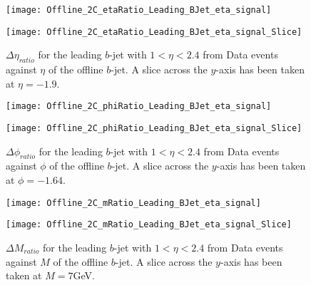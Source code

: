 		\begin{figure}[h]
			\centering
			
			\begin{minipage}[h]{0.33\linewidth}
				\texttt{[image: Offline\_2C\_etaRatio\_Leading\_BJet\_eta\_signal]}
			\end{minipage}
			\quad
			\begin{minipage}[h]{0.33\linewidth}
				\texttt{[image: Offline\_2C\_etaRatio\_Leading\_BJet\_eta\_signal\_Slice]}
			\end{minipage}
			\caption{$\Delta \eta_{ratio}$ for the leading \pt $b$-jet with $1 < \eta < 2.4$ from Data events against $\eta$ of the offline $b$-jet. A slice across the $y$-axis has been taken at $\eta=-1.9$. }
			\label{fig:D:leadingbetacore}
		\end{figure}
		
		\begin{figure}[h]
			\centering
			
			\begin{minipage}[h]{0.33\linewidth}
				\texttt{[image: Offline\_2C\_phiRatio\_Leading\_BJet\_eta\_signal]}
			\end{minipage}
			\quad
			\begin{minipage}[h]{0.33\linewidth}
				\texttt{[image: Offline\_2C\_phiRatio\_Leading\_BJet\_eta\_signal\_Slice]}
			\end{minipage}
			\caption{$\Delta \phi_{ratio}$ for the leading \pt $b$-jet with $1 < \eta < 2.4$ from Data events against $\phi$ of the offline $b$-jet. A slice across the $y$-axis has been taken at $\phi=-1.64$. }
			\label{fig:D:leadingbphicore}
		\end{figure}
		
		\begin{figure}[h]
			\centering
			
			\begin{minipage}[h]{0.33\linewidth}
				\texttt{[image: Offline\_2C\_mRatio\_Leading\_BJet\_eta\_signal]}
			\end{minipage}
			\quad
			\begin{minipage}[h]{0.33\linewidth}
				\texttt{[image: Offline\_2C\_mRatio\_Leading\_BJet\_eta\_signal\_Slice]}
			\end{minipage}
			\caption{$\Delta M_{ratio}$ for the leading \pt $b$-jet with $1 < \eta < 2.4$ from Data events against $M$ of the offline $b$-jet. A slice across the $y$-axis has been taken at $M=7$GeV. }
			\label{fig:D:leadingbmcore}
		\end{figure}

